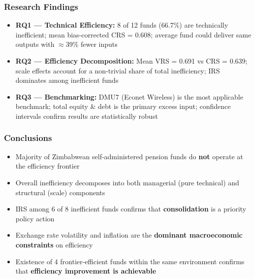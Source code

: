 \documentclass{beamer}
\begin{document}

\begin{frame}
    \frametitle{Research Findings}
    \begin{itemize}
        \item \textbf{RQ1 --- Technical Efficiency:} 8 of 12 funds (66.7\%) are technically inefficient; mean bias-corrected CRS = 0.608; average fund could deliver same outputs with $\approx$39\% fewer inputs
        \item \textbf{RQ2 --- Efficiency Decomposition:} Mean VRS = 0.691 vs CRS = 0.639; scale effects account for a non-trivial share of total inefficiency; IRS dominates among inefficient funds
        \item \textbf{RQ3 --- Benchmarking:} DMU7 (Econet Wireless) is the most applicable benchmark; total equity \& debt is the primary excess input; confidence intervals confirm results are statistically robust
    \end{itemize}
\end{frame}

\begin{frame}
    \frametitle{Conclusions}
    \begin{itemize}
        \item Majority of Zimbabwean self-administered pension funds do \textbf{not} operate at the efficiency frontier
        \item Overall inefficiency decomposes into both managerial (pure technical) and structural (scale) components
        \item IRS among 6 of 8 inefficient funds confirms that \textbf{consolidation} is a priority policy action
        \item Exchange rate volatility and inflation are the \textbf{dominant macroeconomic constraints} on efficiency
        \item Existence of 4 frontier-efficient funds within the same environment confirms that \textbf{efficiency improvement is achievable}
    \end{itemize}
\end{frame}
\end{document}
